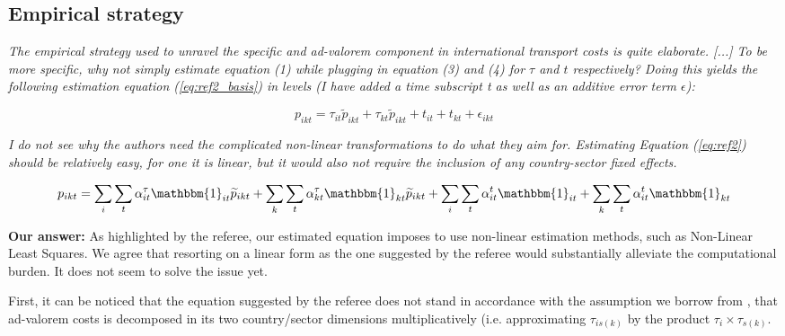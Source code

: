 \documentclass[a4paper,11pt]{article}
\begin{document}

\subsection{Empirical strategy}

\textit{The empirical strategy used to unravel the specific and ad-valorem component in international
transport costs is quite elaborate. [...] To be more specific, why not simply estimate equation (1) while plugging
in equation (3) and (4) for $\tau$ and $t$ respectively? Doing this yields the following estimation equation (\ref{eq:ref2_basis}) in
levels (I have added a time subscript t as well as an additive error term $\epsilon$):}

\begin{equation}
p_{ikt}=\tau_{it}\widetilde{p}_{ikt}+ \tau_{kt}\widetilde{p}_{ikt} + t_{it} + t_{kt} + \epsilon_{ikt}   \label{eq:ref2_basis}
\end{equation}

\textit{I do not see why the authors need the complicated non-linear transformations to do what they aim
for. Estimating Equation (\ref{eq:ref2}) should be relatively easy, for one it is linear, but it would also not require the
inclusion of any country-sector fixed effects.}

\begin{equation}
p_{ikt}= \sum_i \sum_t \alpha_{it}^\tau \mathbbm{1}_{it}\widetilde{p}_{ikt} +  \sum_k \sum_t \alpha_{kt}^\tau \mathbbm{1}_{kt}\widetilde{p}_{ikt} + \sum_i \sum_t \alpha_{it}^t \mathbbm{1}_{it} + \sum_k \sum_t \alpha_{it}^t\mathbbm{1}_{kt} \label{eq:ref2}
\end{equation}


\textbf{Our answer:} As highlighted by the referee, our estimated equation imposes to use non-linear estimation methods, such as Non-Linear Least Squares. We agree that resorting on a linear form as the one suggested by the referee would substantially alleviate the computational burden. It does not seem to solve the issue yet.

First, it can be noticed that the equation suggested by the referee does not stand in accordance with the assumption we borrow from \cite{Irrazabal_2015}, that ad-valorem costs is decomposed in its two country/sector dimensions multiplicatively (i.e. approximating $\tau_{is(k)}$ by the product $\tau_i\times \tau_{s(k)}$.
\end{document}
